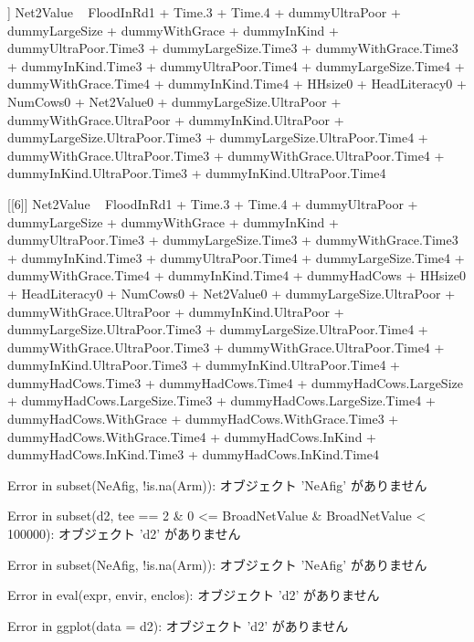 \begin{Schunk}
\begin{Soutput}
[[5]]
Net2Value ~ FloodInRd1 + Time.3 + Time.4 + dummyUltraPoor + dummyLargeSize + 
    dummyWithGrace + dummyInKind + dummyUltraPoor.Time3 + dummyLargeSize.Time3 + 
    dummyWithGrace.Time3 + dummyInKind.Time3 + dummyUltraPoor.Time4 + 
    dummyLargeSize.Time4 + dummyWithGrace.Time4 + dummyInKind.Time4 + 
    HHsize0 + HeadLiteracy0 + NumCows0 + Net2Value0 + dummyLargeSize.UltraPoor + 
    dummyWithGrace.UltraPoor + dummyInKind.UltraPoor + dummyLargeSize.UltraPoor.Time3 + 
    dummyLargeSize.UltraPoor.Time4 + dummyWithGrace.UltraPoor.Time3 + 
    dummyWithGrace.UltraPoor.Time4 + dummyInKind.UltraPoor.Time3 + 
    dummyInKind.UltraPoor.Time4

[[6]]
Net2Value ~ FloodInRd1 + Time.3 + Time.4 + dummyUltraPoor + dummyLargeSize + 
    dummyWithGrace + dummyInKind + dummyUltraPoor.Time3 + dummyLargeSize.Time3 + 
    dummyWithGrace.Time3 + dummyInKind.Time3 + dummyUltraPoor.Time4 + 
    dummyLargeSize.Time4 + dummyWithGrace.Time4 + dummyInKind.Time4 + 
    dummyHadCows + HHsize0 + HeadLiteracy0 + NumCows0 + Net2Value0 + 
    dummyLargeSize.UltraPoor + dummyWithGrace.UltraPoor + dummyInKind.UltraPoor + 
    dummyLargeSize.UltraPoor.Time3 + dummyLargeSize.UltraPoor.Time4 + 
    dummyWithGrace.UltraPoor.Time3 + dummyWithGrace.UltraPoor.Time4 + 
    dummyInKind.UltraPoor.Time3 + dummyInKind.UltraPoor.Time4 + 
    dummyHadCows.Time3 + dummyHadCows.Time4 + dummyHadCows.LargeSize + 
    dummyHadCows.LargeSize.Time3 + dummyHadCows.LargeSize.Time4 + 
    dummyHadCows.WithGrace + dummyHadCows.WithGrace.Time3 + dummyHadCows.WithGrace.Time4 + 
    dummyHadCows.InKind + dummyHadCows.InKind.Time3 + dummyHadCows.InKind.Time4
\end{Soutput}
\end{Schunk}
\begin{Schunk}
\begin{Soutput}
Error in subset(NeAfig, !is.na(Arm)):  オブジェクト 'NeAfig' がありません 
\end{Soutput}
\begin{Soutput}
Error in subset(d2, tee == 2 & 0 <= BroadNetValue & BroadNetValue < 100000):  オブジェクト 'd2' がありません 
\end{Soutput}
\end{Schunk}
\begin{Schunk}
\begin{Soutput}
Error in subset(NeAfig, !is.na(Arm)):  オブジェクト 'NeAfig' がありません 
\end{Soutput}
\begin{Soutput}
Error in eval(expr, envir, enclos):  オブジェクト 'd2' がありません 
\end{Soutput}
\begin{Soutput}
Error in ggplot(data = d2):  オブジェクト 'd2' がありません 
\end{Soutput}
\end{Schunk}
